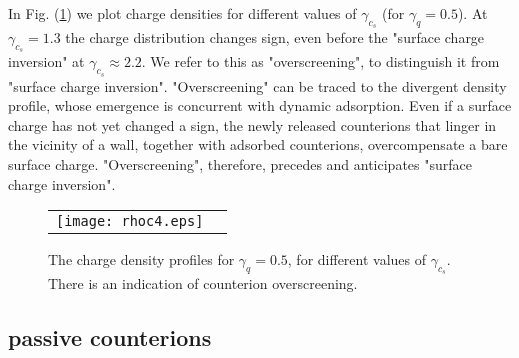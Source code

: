 \documentclass[pre,twocolumn,graphicx]{revtex4-1}
\begin{document}
In Fig. (\ref{fig:rhocd}) we plot charge densities for different values of $\gamma_{c_s}$ (for $\gamma_q=0.5$).  
At $\gamma_{c_s} = 1.3$ the charge distribution changes sign, even before the "surface charge inversion"
at $\gamma_{c_s}\approx 2.2$.  We refer to this as "overscreening", to distinguish it from "surface charge inversion".  
"Overscreening" can be traced to the divergent density profile, whose emergence is concurrent with dynamic adsorption.  
Even if a surface charge has not yet changed a 
sign, the newly released counterions that linger in the vicinity of a wall, together with adsorbed counterions, 
overcompensate a bare surface charge.  "Overscreening", therefore, precedes and anticipates "surface charge inversion".  
\graphicspath{{figures/}}
\begin{figure}[h] 
 \begin{center}
 \begin{tabular}{rr}
  \texttt{[image: rhoc4.eps]}
 \end{tabular}
 \end{center}
\caption{The charge density profiles for $\gamma_q=0.5$, for different values of $\gamma_{c_s}$.  
There is an indication of counterion overscreening.  } 
\label{fig:rhocd}
\end{figure}







\subsection{passive counterions}
\end{document}
